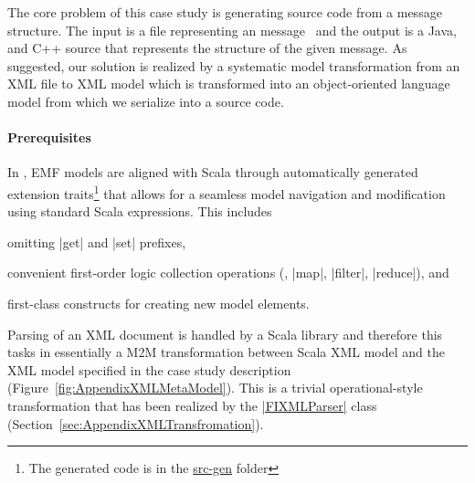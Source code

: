 
\label{sec:SolutionDescription}

\enlargethispage{20mm}

The core problem of this case study is generating source code from a \FIXML message structure.
The input is a file representing an  message~\cite{FIXML2004} and the output is a Java, \Csharp and C++ source that represents the structure of the given \FIXML message. 
As suggested, our solution is realized by a systematic model transformation from an XML file to XML model which is transformed into an object-oriented language model from which we serialize into a source code.

\vspace*{-5mm}
\paragraph{Prerequisites}
%
In \SIGMA, EMF models are aligned with Scala through automatically generated extension traits\footnote{The generated code is in the \href{https://github.com/fikovnik/ttc14-fixml-sigma/blob/master/ttc14-fixml-base/src-gen}{src-gen} folder} that allows for a seamless model navigation and modification using standard Scala expressions.
This includes
%
\begin{inparaitem}[]
  \item omitting \Scala|get| and \Scala|set| prefixes,
  \item convenient first-order logic collection operations (\Eg, \Scala|map|, \Scala|filter|, \Scala|reduce|), and
  \item first-class constructs for creating new model elements.
\end{inparaitem}


Parsing of an XML document is handled by a Scala library and therefore this tasks in essentially a M2M transformation between Scala XML model and the XML model specified in the case study description (\Cf Figure~\ref{fig:AppendixXMLMetaModel}).
This is a trivial operational-style transformation that has been realized by the \href{https://github.com/fikovnik/ttc14-fixml-sigma/blob/master/ttc14-fixml-base/src/fr/inria/spirals/sigma/ttc14/fixml/FIXMLParser.scala}{\Scala|FIXMLParser|} class (\Cf Section~\ref{sec:AppendixXMLTransfromation}).


